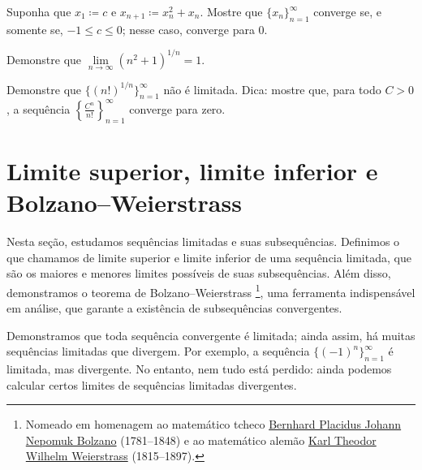 \begin{exercise} \label{exercise:convergentinitialvalues}
Suponha que $x_1 \coloneqq c$ e $x_{n+1} \coloneqq x_n^2+x_n$.
Mostre que $\{ x_n \}_{n=1}^\infty$ converge se, e somente se, $-1 \leq c \leq 0$; nesse caso,
converge para 0.
\end{exercise}

\begin{exercise}
Demonstre que $\lim\limits_{n \to \infty} {(n^2+1)}^{1/n} = 1$.
\end{exercise}

\begin{exercise}
Demonstre que $\bigl\{ {(n!)}^{1/n} \bigr\}_{n=1}^\infty$
não é limitada.
Dica: mostre que, para todo $C > 0$, a sequência $\left\{ \frac{C^n}{n!}
\right\}_{n=1}^\infty$ converge para zero.
\end{exercise}


\sectionnewpage

\section{Limite superior, limite inferior e Bolzano--Weierstrass}
\label{sec:bw}



Nesta seção, estudamos sequências limitadas e suas subsequências.
Definimos o que chamamos de limite superior e limite inferior
de uma sequência limitada, que são os maiores e menores
limites possíveis de suas subsequências.
Além disso, demonstramos o
teorema de Bolzano--Weierstrass%
\footnote{%
Nomeado em homenagem ao matemático tcheco
\href{https://en.wikipedia.org/wiki/Bernard_Bolzano}{Bernhard Placidus Johann Nepomuk Bolzano}
(1781--1848) e ao matemático alemão
\href{https://en.wikipedia.org/wiki/Karl_Weierstrass}{Karl Theodor Wilhelm Weierstrass}
(1815--1897).}, uma
ferramenta indispensável em análise, que garante a existência de
subsequências convergentes.

Demonstramos que toda sequência convergente é limitada; ainda assim,
há muitas sequências limitadas que divergem. Por exemplo,
a sequência $\bigl\{ {(-1)}^n \bigr\}_{n=1}^\infty$ é limitada,
mas divergente. No entanto, nem tudo está perdido: ainda podemos
calcular certos limites de sequências limitadas divergentes.

